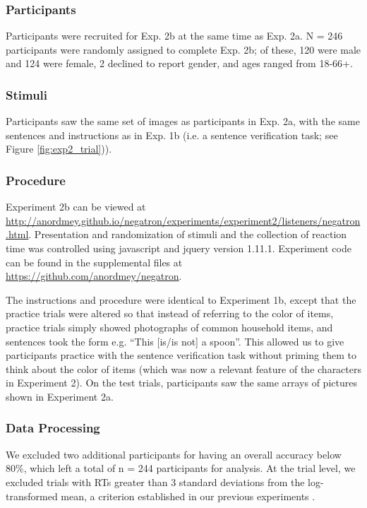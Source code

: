 \documentclass[man, floatsintext, noapacite]{apa6}
\begin{document}
\subsubsection{Participants} 

Participants were recruited for Exp. 2b at the same time as Exp. 2a. N = 246 participants were randomly assigned to complete Exp. 2b; of these, 120 were male and 124 were female, 2 declined to report gender, and ages ranged from 18-66+.

\subsubsection{Stimuli}

Participants saw the same set of images as participants in Exp. 2a, with the same sentences and instructions as in Exp. 1b (i.e. a sentence verification task; see Figure \ref{fig:exp2_trial})).  

\subsubsection{Procedure}

Experiment 2b can be viewed at \url{http://anordmey.github.io/negatron/experiments/experiment2/listeners/negatron.html}. Presentation and randomization of stimuli and the collection of reaction time was controlled using javascript and jquery version 1.11.1. Experiment code can be found in the supplemental files at  \url{https://github.com/anordmey/negatron}.

The instructions and procedure were identical to Experiment 1b, except that the practice trials were altered so that instead of referring to the color of items, practice trials simply showed photographs of common household items, and sentences took the form e.g. ``This [is/is not] a spoon''. This allowed us to give participants practice with the sentence verification task without priming them to think about the color of items (which was now a relevant feature of the characters in Experiment 2). On the test trials, participants saw the same arrays of pictures shown in Experiment 2a. 

\subsubsection{Data Processing}

We excluded two additional participants for having an overall accuracy below 80\%, which left a total of n = 244 participants for analysis. At the trial level, we excluded trials with RTs greater than 3 standard deviations from the log-transformed mean, a criterion established in our previous experiments \cite{nordmeyer2014}. 
\end{document}
